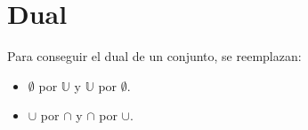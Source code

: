 \documentclass[11pt,a4paper]{article}
\begin{document}
\section{Dual}
Para conseguir el dual de un conjunto, se reemplazan:
\begin{itemize}
\item $\emptyset$ por $\mathbb{U}$ y $\mathbb{U}$ por $\emptyset$.
\item $\cup$ por $\cap$ y $\cap$ por $\cup$.
\end{itemize}
\end{document}
